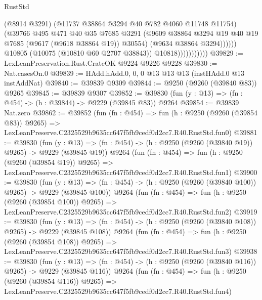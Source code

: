 \begin{lexlean}{RustStd}
\begin{coremodule}
                                  (@8914 @3291)
                                  (@11737 @38864 @3294 @40 @782 @4060 @11748 @11754)
                                  (@39766
                                    @495
                                    @471
                                    @40
                                    @35
                                    @7685
                                    @3291
                                    (@9609
                                      @38864
                                      @3294
                                      @19
                                      @40
                                      @19
                                      @7685
                                      (@9617 (@9618 @38864 @19))
                                      @30554)
                                    (@9634 @38864 @3294))))))
                          @10805
                          (@10075 (@10810 @60 @2707 @38843))
                          @10818)))))))))))
@39829 := LexLeanPreservation.Rust.CrateOK @9224 @9226 @9228
@39830 := Nat.casesOn.{0}
@39839 := HAdd.hAdd.{0, 0, 0} @13 @13 @13 (instHAdd.{0} @13 instAddNat)
@39840 := @39839 @9309
@39844 := @9250 (@9260 (@39840 @83)) @9265
@39845 := @39839 @9307
@39852 := @39830 (fun (y : @13) => (fn : @454) -> (h : @39844) -> @9229 (@39845 @83)) @9264
@39854 := @39839 Nat.zero
@39862 := @39852
    (fun (fn : @454) =>
    fun (h : @9250 (@9260 (@39854 @83)) @9265) =>
    LexLeanPreserve.C2325529b9635cc647f5fb9cedf0d2cc7.R40.RustStd.fun0)
@39881 := @39830
    (fun (y : @13) => (fn : @454) -> (h : @9250 (@9260 (@39840 @19)) @9265) -> @9229 (@39845 @19))
    @9264
    (fun (fn : @454) =>
    fun (h : @9250 (@9260 (@39854 @19)) @9265) =>
    LexLeanPreserve.C2325529b9635cc647f5fb9cedf0d2cc7.R40.RustStd.fun1)
@39900 := @39830
    (fun (y : @13) => (fn : @454) -> (h : @9250 (@9260 (@39840 @100)) @9265) -> @9229 (@39845 @100))
    @9264
    (fun (fn : @454) =>
    fun (h : @9250 (@9260 (@39854 @100)) @9265) =>
    LexLeanPreserve.C2325529b9635cc647f5fb9cedf0d2cc7.R40.RustStd.fun2)
@39919 := @39830
    (fun (y : @13) => (fn : @454) -> (h : @9250 (@9260 (@39840 @108)) @9265) -> @9229 (@39845 @108))
    @9264
    (fun (fn : @454) =>
    fun (h : @9250 (@9260 (@39854 @108)) @9265) =>
    LexLeanPreserve.C2325529b9635cc647f5fb9cedf0d2cc7.R40.RustStd.fun3)
@39938 := @39830
    (fun (y : @13) => (fn : @454) -> (h : @9250 (@9260 (@39840 @116)) @9265) -> @9229 (@39845 @116))
    @9264
    (fun (fn : @454) =>
    fun (h : @9250 (@9260 (@39854 @116)) @9265) =>
    LexLeanPreserve.C2325529b9635cc647f5fb9cedf0d2cc7.R40.RustStd.fun4)

\end{coremodule}
\end{lexlean}
